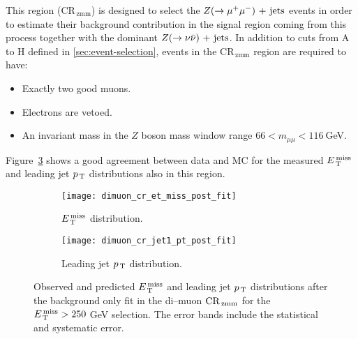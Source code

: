 This region (CR$_\mathrm{\, zmm}$) is designed to select the $Z (\rightarrow \mu^+ \mu^-)\mathrm{~+~jets}$
events in order to estimate their background contribution in the signal region
coming from this process together with the dominant $Z (\rightarrow \nu \bar{\nu})\mathrm{~+~jets}$. In
addition to cuts from A to H defined in \cref{sec:event-selection}, events in
the CR$_\mathrm{\, zmm}$ region are required to have:
\begin{itemize}
\item Exactly two good muons.
\item Electrons are vetoed.
\item An invariant mass in the $Z$ boson mass window range
  $66 < m_{\mu \mu} < 116~$GeV.
\end{itemize}
Figure~\ref{fig:dimuon_cr_plots} shows a good agreement between data and MC for
the measured $E_\mathrm{\, T}^\mathrm{\, miss}$ and leading jet $p_\mathrm{\, T}$ distributions also in this region.
\begin{figure}[!h]
  \centering
  \begin{subfigure}[t]{.48\linewidth}
    \texttt{[image: dimuon\_cr\_et\_miss\_post\_fit]}
    \caption{$E_\mathrm{\, T}^\mathrm{\, miss}$ distribution.}
    \label{fig:dimuon_cr_et_miss_pre_fit}
  \end{subfigure}
  \begin{subfigure}[t]{.48\linewidth}
    \texttt{[image: dimuon\_cr\_jet1\_pt\_post\_fit]}
    \caption{Leading jet $p_\mathrm{\, T}$ distribution.}
    \label{fig:dimuon_cr_jet1_pt_pre_fit}
  \end{subfigure}
  \caption{Observed and predicted $E_\mathrm{\, T}^\mathrm{\, miss}$ and leading jet $p_\mathrm{\, T}$ distributions
    after the background only fit in the di--muon $\mathrm{CR}_\mathrm{\, zmm}$ for the
    $E_\mathrm{\, T}^\mathrm{\, miss} > 250~$GeV selection. The error bands include the statistical and
    systematic error.}
  \label{fig:dimuon_cr_plots}
\end{figure}

